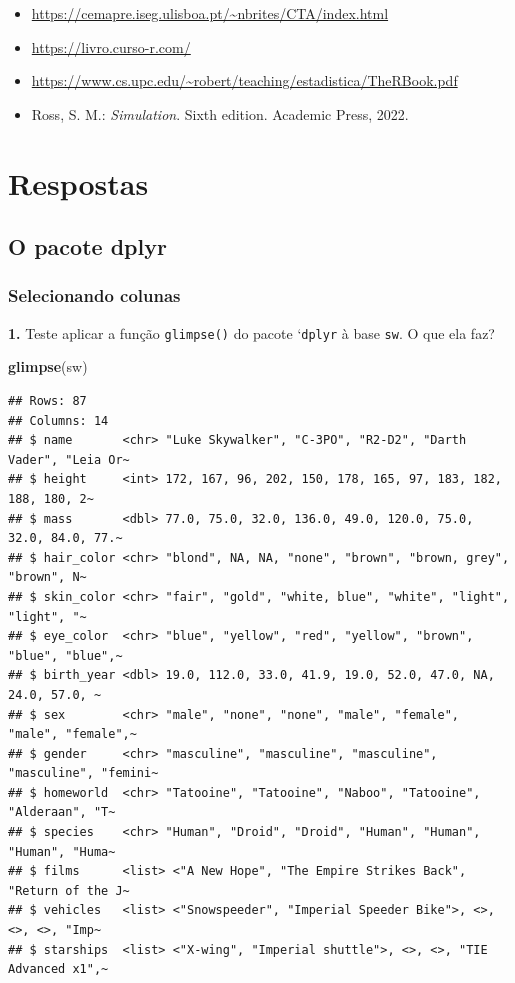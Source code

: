 \documentclass[
]{book}
\newenvironment{Shaded}{\begin{snugshade}}{\end{snugshade}}
\newcommand{\FunctionTok}[1]{\textcolor[rgb]{0.13,0.29,0.53}{\textbf{#1}}}
\newcommand{\NormalTok}[1]{#1}
\providecommand{\tightlist}{%
  \setlength{\itemsep}{0pt}\setlength{\parskip}{0pt}}
\begin{document}
\begin{itemize}
\tightlist
\item
  \url{https://cemapre.iseg.ulisboa.pt/~nbrites/CTA/index.html}
\item
  \url{https://livro.curso-r.com/}
\item
  \url{https://www.cs.upc.edu/~robert/teaching/estadistica/TheRBook.pdf}
\item
  Ross, S. M.: \emph{Simulation}. Sixth edition. Academic Press, 2022.
\end{itemize}

\chapter{Respostas}\label{respostas}

\section{O pacote dplyr}\label{o-pacote-dplyr}

\subsection{Selecionando colunas}\label{selecionando-colunas}

\textbf{1.} Teste aplicar a função \texttt{glimpse()} do pacote `\texttt{dplyr} à base
\texttt{sw}. O que ela faz?

\begin{Shaded}
\begin{Highlighting}[]
\FunctionTok{glimpse}\NormalTok{(sw)}
\end{Highlighting}
\end{Shaded}

\begin{verbatim}
## Rows: 87
## Columns: 14
## $ name       <chr> "Luke Skywalker", "C-3PO", "R2-D2", "Darth Vader", "Leia Or~
## $ height     <int> 172, 167, 96, 202, 150, 178, 165, 97, 183, 182, 188, 180, 2~
## $ mass       <dbl> 77.0, 75.0, 32.0, 136.0, 49.0, 120.0, 75.0, 32.0, 84.0, 77.~
## $ hair_color <chr> "blond", NA, NA, "none", "brown", "brown, grey", "brown", N~
## $ skin_color <chr> "fair", "gold", "white, blue", "white", "light", "light", "~
## $ eye_color  <chr> "blue", "yellow", "red", "yellow", "brown", "blue", "blue",~
## $ birth_year <dbl> 19.0, 112.0, 33.0, 41.9, 19.0, 52.0, 47.0, NA, 24.0, 57.0, ~
## $ sex        <chr> "male", "none", "none", "male", "female", "male", "female",~
## $ gender     <chr> "masculine", "masculine", "masculine", "masculine", "femini~
## $ homeworld  <chr> "Tatooine", "Tatooine", "Naboo", "Tatooine", "Alderaan", "T~
## $ species    <chr> "Human", "Droid", "Droid", "Human", "Human", "Human", "Huma~
## $ films      <list> <"A New Hope", "The Empire Strikes Back", "Return of the J~
## $ vehicles   <list> <"Snowspeeder", "Imperial Speeder Bike">, <>, <>, <>, "Imp~
## $ starships  <list> <"X-wing", "Imperial shuttle">, <>, <>, "TIE Advanced x1",~
\end{verbatim}
\end{document}
